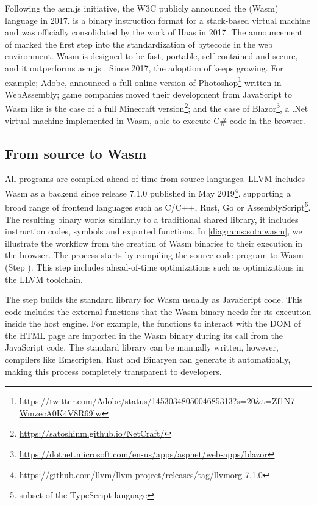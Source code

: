 Following the asm.js initiative, the W3C publicly announced the \wasm (Wasm) language in 2017. \wasm is a binary instruction format for a stack-based virtual machine and was officially consolidated by the work of Haas \etal \cite{Haas_2017} in 2017. The announcement of \wasm marked the first step into the standardization of bytecode in the web environment. Wasm  is designed to be fast, portable, self-contained and secure, and it outperforms asm.js \cite{Haas_2017}. Since 2017, the adoption of \wasm keeps growing. For example; Adobe, announced a full online version of Photoshop\footnote{\url{https://twitter.com/Adobe/status/1453034805004685313?s=20&t=Zf1N7-WmzecA0K4V8R69lw}} written in WebAssembly;  game companies moved their development from JavaScript to Wasm like is the case of a full Minecraft version\footnote{\url{https://satoshinm.github.io/NetCraft/}}; and the case of Blazor\footnote{\url{https://dotnet.microsoft.com/en-us/apps/aspnet/web-apps/blazor}}, a .Net virtual machine implemented in Wasm, able to execute C\# code in the browser.


\subsection{From source to Wasm}

All \wasm programs are compiled ahead-of-time from source languages. LLVM includes Wasm  as a backend since release 7.1.0 published in May 2019\footnote{\url{https://github.com/llvm/llvm-project/releases/tag/llvmorg-7.1.0}}, supporting a broad range of frontend languages such as C/C++, Rust, Go or AssemblyScript\footnote{subset of the TypeScript language}. The resulting binary works similarly to a traditional shared library, it includes instruction codes, symbols and exported functions. In \autoref{diagrams:sota:wasm}, we illustrate the workflow from the creation of Wasm  binaries to their execution in the browser. The process starts by compiling the source code program to Wasm  (Step ). This step includes ahead-of-time optimizations such as optimizations in the LLVM toolchain. 


The step  builds the standard library for Wasm  usually as JavaScript  code. This code includes the external functions that the Wasm  binary needs for its execution inside the host engine. For example, the functions to interact with the DOM of the HTML page are imported in the Wasm  binary during its call from the JavaScript code. The standard library can be manually written, however, compilers like Emscripten, Rust and Binaryen can generate it automatically, making this process completely transparent to developers.

